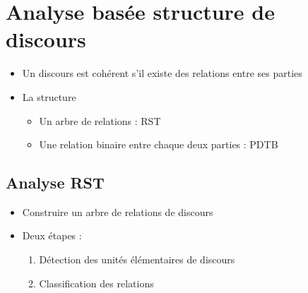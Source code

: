 \documentclass{KodeBook}
\begin{document}
\section{Analyse basée structure de discours}

\begin{itemize}
	\item Un discours est cohérent s'il existe des relations entre ses parties
	\item La structure
	\begin{itemize}
		\item Un arbre de relations : RST
		\item Une relation binaire entre chaque deux parties : PDTB
	\end{itemize}
\end{itemize}

\subsection{Analyse RST}

\begin{itemize}
	\item Construire un arbre de relations de discours
	\item Deux étapes : 
	\begin{enumerate}
		\item Détection des unités élémentaires de discours
		\item Classification des relations
	\end{enumerate}
\end{itemize}

\begin{center}
\end{center}
\end{document}
